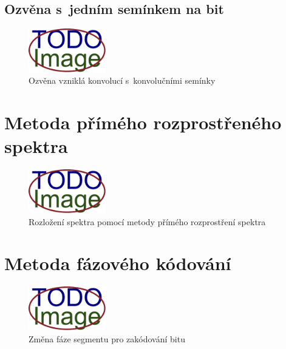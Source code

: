 \subsection*{Ozvěna s~jedním semínkem na bit}
\label{sec:echo-single-kernel}


\blindtext

\begin{figure}[hbt]
    \centering
    \includegraphics[width=0.3\textwidth]{obrazky/placeholder.pdf}
    \caption{Ozvěna vzniklá konvolucí s~konvolučními semínky}
    \label{pic:echo-single-kernel-echo}
\end{figure}

\blindtext

\section{Metoda přímého rozprostřeného spektra}
\label{sec:dsss}


\blindtext

\begin{figure}[hbt]
    \centering
    \includegraphics[width=0.3\textwidth]{obrazky/placeholder.pdf}
    \caption{Rozložení spektra pomocí metody přímého rozprostření spektra}
    \label{pic:dsss-spreading}
\end{figure}

\blindtext

\section{Metoda fázového kódování}
\label{sec:phase-coding}


\blindtext

\begin{figure}[hbt]
    \centering
    \includegraphics[width=0.3\textwidth]{obrazky/placeholder.pdf}
    \caption{Změna fáze segmentu pro zakódování bitu}
    \label{pic:phase-coding-phase-change}
\end{figure}

